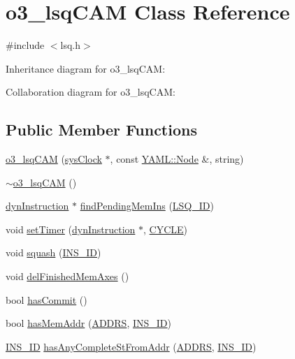 \hypertarget{classo3__lsqCAM}{
\section{o3\_\-lsqCAM Class Reference}
\label{classo3__lsqCAM}
}


{\ttfamily \#include $<$lsq.h$>$}



Inheritance diagram for o3\_\-lsqCAM:


Collaboration diagram for o3\_\-lsqCAM:
\subsection*{Public Member Functions}
\begin{DoxyCompactItemize}
\item 
\hyperlink{classo3__lsqCAM_a1ad55f822a48b91004a5081e88952362}{o3\_\-lsqCAM} (\hyperlink{classsysClock}{sysClock} $\ast$, const \hyperlink{classYAML_1_1Node}{YAML::Node} \&, string)
\item 
\hyperlink{classo3__lsqCAM_a5bc53f5f972f4d902325bc702efe8491}{$\sim$o3\_\-lsqCAM} ()
\item 
\hyperlink{classdynInstruction}{dynInstruction} $\ast$ \hyperlink{classo3__lsqCAM_a7db68789c8d9af13bbc9ec485b4972bc}{findPendingMemIns} (\hyperlink{global_2global_8h_a3bb5a7f1114a20672e012bf0dfe5fb24}{LSQ\_\-ID})
\item 
void \hyperlink{classo3__lsqCAM_a25372198cf9ceb3037dd0d027006eb08}{setTimer} (\hyperlink{classdynInstruction}{dynInstruction} $\ast$, \hyperlink{global_2global_8h_a7e19a550ec11d1ed921deb20c22efb5b}{CYCLE})
\item 
void \hyperlink{classo3__lsqCAM_a95e286b95f3651e40d57206eb2a41308}{squash} (\hyperlink{global_2global_8h_a1883c47d0023d0f200e1d86eced6a070}{INS\_\-ID})
\item 
void \hyperlink{classo3__lsqCAM_aa7fdfa8e6591d754e194c7052e7e17d3}{delFinishedMemAxes} ()
\item 
bool \hyperlink{classo3__lsqCAM_ad3d6f79a7377317fc859080d337d428a}{hasCommit} ()
\item 
bool \hyperlink{classo3__lsqCAM_ac52c64978b8fbe0569bb67f0d77e2ec9}{hasMemAddr} (\hyperlink{binaryTranslator_2frontend_2stInstruction_8h_a7ea74bb9ffd2e4d41550ae2383dd25bc}{ADDRS}, \hyperlink{global_2global_8h_a1883c47d0023d0f200e1d86eced6a070}{INS\_\-ID})
\item 
\hyperlink{global_2global_8h_a1883c47d0023d0f200e1d86eced6a070}{INS\_\-ID} \hyperlink{classo3__lsqCAM_ad0ef7ab14e36284321707f52bfe32d9f}{hasAnyCompleteStFromAddr} (\hyperlink{binaryTranslator_2frontend_2stInstruction_8h_a7ea74bb9ffd2e4d41550ae2383dd25bc}{ADDRS}, \hyperlink{global_2global_8h_a1883c47d0023d0f200e1d86eced6a070}{INS\_\-ID})

\end{DoxyCompactItemize}
